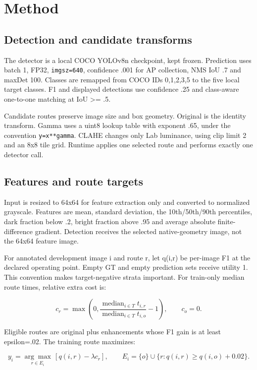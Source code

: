 \documentclass[11pt,a4paper]{article}
\begin{document}
\section{Method}

\subsection{Detection and candidate transforms}

The detector is a local COCO YOLOv8n checkpoint, kept frozen. Prediction uses batch 1, FP32, \texttt{imgsz=640}, confidence .001 for AP collection, NMS IoU .7 and maxDet 100. Classes are remapped from COCO IDs 0,1,2,3,5 to the five local target classes. F1 and displayed detections use confidence .25 and class-aware one-to-one matching at IoU >= .5.


Candidate routes preserve image size and box geometry. Original is the identity transform. Gamma uses a uint8 lookup table with exponent .65, under the convention \texttt{y=x**gamma}. CLAHE changes only Lab luminance, using clip limit 2 and an 8x8 tile grid. Runtime applies one selected route and performs exactly one detector call.


\subsection{Features and route targets}

Input is resized to 64x64 for feature extraction only and converted to normalized grayscale. Features are mean, standard deviation, the 10th/50th/90th percentiles, dark fraction below .2, bright fraction above .95 and average absolute finite-difference gradient. Detection receives the selected native-geometry image, not the 64x64 feature image.


For annotated development image i and route r, let q(i,r) be per-image F1 at the declared operating point. Empty GT and empty prediction sets receive utility 1. This convention makes target-negative strata important. For train-only median route times, relative extra cost is:


\[
c_r=\max\left(0,\frac{\operatorname{median}_{i\in T}t_{i,r}}{\operatorname{median}_{i\in T}t_{i,o}}-1\right),\qquad c_o=0.
\]

Eligible routes are original plus enhancements whose F1 gain is at least epsilon=.02. The training route maximizes:


\[
y_i=\underset{r\in E_i}{\arg\max}\,[q(i,r)-\lambda c_r],\qquad E_i=\{o\}\cup\{r:q(i,r)\ge q(i,o)+0.02\}.
\]
\end{document}
